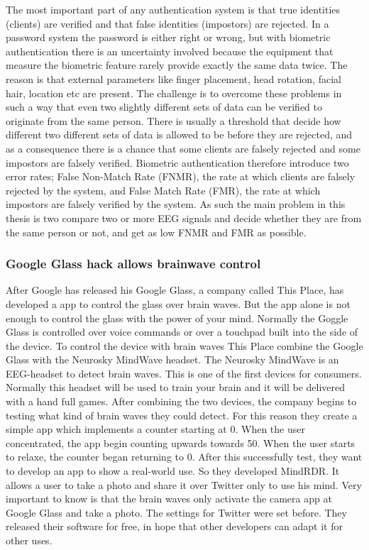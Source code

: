 The most important part of any authentication system is that true identities (clients) are verified and that false identities (impostors) are rejected. In a password system the password is either right or wrong, but with biometric authentication there is an uncertainty involved because the equipment that  measure the biometric feature rarely provide exactly the same data twice. The reason is that external parameters like finger placement, head rotation, facial hair, location etc are present. The challenge is to overcome these problems in such a way that even two slightly different sets of data can be verified to originate from the same person. There is usually a threshold that decide how different
two different sets of data is allowed to be before they are rejected, and as a consequence there is a chance that some clients are falsely rejected and some impostors are falsely verified.
Biometric authentication therefore introduce two error rates; False Non-Match Rate (FNMR), the rate at which clients are falsely rejected by the system, and False Match Rate (FMR), the rate at which impostors are falsely verified by the system. As such the main problem in this thesis is two compare two or more EEG signals and decide whether they are from the same person or not, and get as low FNMR and FMR as possible.

\subsubsection{Google Glass hack allows brainwave control}
After Google has released his Google Glass, a company called This Place, has developed a app to control the glass over brain waves. But the app alone is not enough to control the glass with the power of your mind. Normally the Goggle Glass is controlled over voice commands or over a touchpad built into the side of the device. To control the device with brain waves This Place combine the Google Glass with the Neurosky MindWave headset. The Neurosky MindWave is an EEG-headset to detect brain waves. This is one of the first devices for consumers. Normally this headset will be used to train your brain and it will be delivered with a hand full games. After combining the two devices, the company begins to testing what kind of brain waves they could detect. For this reason they create a simple app which implements a counter starting at 0. When the user concentrated, the app begin counting upwards towards 50. When the user starts to relaxe, the counter began returning to 0. After this successfully test, they want to develop an app to show a real-world use. So they developed MindRDR. It allows a user to take a photo and share it over Twitter only to use his mind. Very important to know is that the brain waves only activate the camera app at Google Glass and take a photo. The settings for Twitter were set before. They released their software for free, in hope that other developers can adapt it for other uses.

